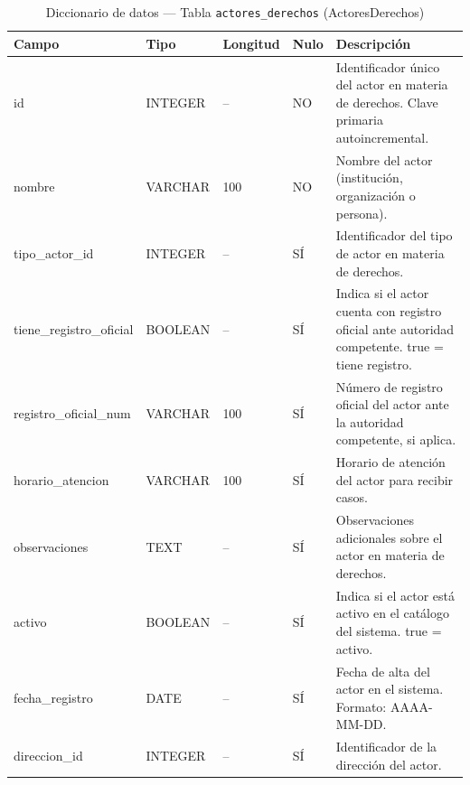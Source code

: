 \begin{table}[H]
	\centering
	\caption{Diccionario de datos --- Tabla \texttt{actores\_derechos} (ActoresDerechos)}
	\label{tab:data-dict-actores_derechos}
	\scriptsize
	\begin{tabular}{>{\ttfamily\raggedright\arraybackslash}p{3.6cm} p{1.6cm} p{1.3cm} p{0.7cm} p{5.6cm}}
		\toprule
		\textbf{Campo} & \textbf{Tipo} & \textbf{Longitud} & \textbf{Nulo} & \textbf{Descripción} \\
		\midrule
		id & INTEGER & -- & NO & Identificador único del actor en materia de derechos. Clave primaria autoincremental. \\
		nombre & VARCHAR & 100 & NO & Nombre del actor (institución, organización o persona). \\
		tipo\_actor\_id & INTEGER & -- & SÍ & Identificador del tipo de actor en materia de derechos. \\
		tiene\_registro\_oficial & BOOLEAN & -- & SÍ & Indica si el actor cuenta con registro oficial ante autoridad competente. true = tiene registro. \\
		registro\_oficial\_num & VARCHAR & 100 & SÍ & Número de registro oficial del actor ante la autoridad competente, si aplica. \\
		horario\_atencion & VARCHAR & 100 & SÍ & Horario de atención del actor para recibir casos. \\
		observaciones & TEXT & -- & SÍ & Observaciones adicionales sobre el actor en materia de derechos. \\
		activo & BOOLEAN & -- & SÍ & Indica si el actor está activo en el catálogo del sistema. true = activo. \\
		fecha\_registro & DATE & -- & SÍ & Fecha de alta del actor en el sistema. Formato: AAAA-MM-DD. \\
		direccion\_id & INTEGER & -- & SÍ & Identificador de la dirección del actor. \\
		\bottomrule
	\end{tabular}
\end{table}

